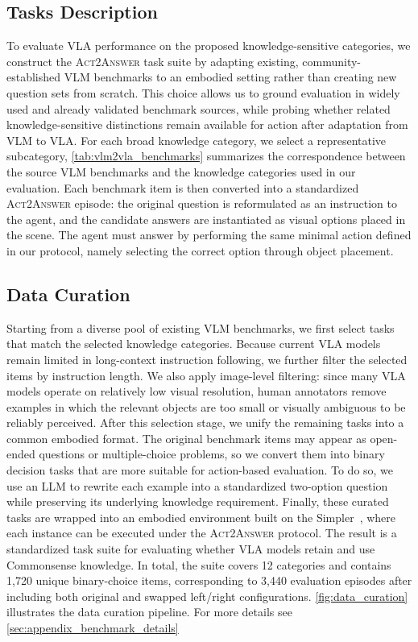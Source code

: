 \documentclass{llmxive}
\begin{document}
\subsection{Tasks Description}

To evaluate VLA performance on the proposed knowledge-sensitive categories, we construct the \textsc{Act2Answer} task suite by adapting existing, community-established VLM benchmarks to an embodied setting rather than creating new question sets from scratch. This choice allows us to ground evaluation in widely used and already validated benchmark sources, while probing whether related knowledge-sensitive distinctions remain available for action after adaptation from VLM to VLA. For each broad knowledge category, we select a representative subcategory, \autoref{tab:vlm2vla_benchmarks} summarizes the correspondence between the source VLM benchmarks and the knowledge categories used in our evaluation. Each benchmark item is then converted into a standardized \textsc{Act2Answer} episode: the original question is reformulated as an instruction to the agent, and the candidate answers are instantiated as visual options placed in the scene. The agent must answer by performing the same minimal action defined in our protocol, namely selecting the correct option through object placement. 

\subsection{Data Curation}

Starting from a diverse pool of existing VLM benchmarks, we first select tasks that match the selected knowledge categories. Because current VLA models remain limited in long-context instruction following, we further filter the selected items by instruction length. We also apply image-level filtering: since many VLA models operate on relatively low visual resolution, human annotators remove examples in which the relevant objects are too small or visually ambiguous to be reliably perceived. After this selection stage, we unify the remaining tasks into a common embodied format. The original benchmark items may appear as open-ended questions or multiple-choice problems, so we convert them into binary decision tasks that are more suitable for action-based evaluation. To do so, we use an LLM to rewrite each example into a standardized two-option question while preserving its underlying knowledge requirement. Finally, these curated tasks are wrapped into an embodied environment built on the Simpler~\citep{simpler}, where each instance can be executed under the \textsc{Act2Answer} protocol. The result is a standardized task suite for evaluating whether VLA models retain and use Commonsense knowledge. In total, the suite covers 12 categories and contains 1,720 unique binary-choice items, corresponding to 3,440 evaluation episodes after including both original and swapped left/right configurations. \autoref{fig:data_curation} illustrates the data curation pipeline. For more details see \autoref{sec:appendix_benchmark_details}
\end{document}
